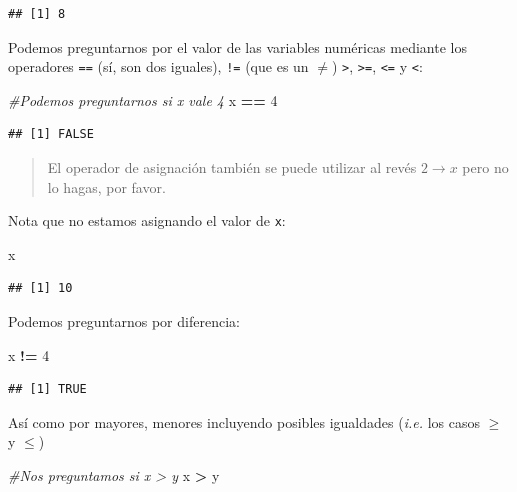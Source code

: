 \documentclass[
]{book}
\newenvironment{Shaded}{\begin{snugshade}}{\end{snugshade}}
\newcommand{\CommentTok}[1]{\textcolor[rgb]{0.56,0.35,0.01}{\textit{#1}}}
\newcommand{\DecValTok}[1]{\textcolor[rgb]{0.00,0.00,0.81}{#1}}
\newcommand{\NormalTok}[1]{#1}
\newcommand{\OperatorTok}[1]{\textcolor[rgb]{0.81,0.36,0.00}{\textbf{#1}}}
\newcommand{\StringTok}[1]{\textcolor[rgb]{0.31,0.60,0.02}{#1}}
\begin{document}
\begin{verbatim}
## [1] 8
\end{verbatim}

Podemos preguntarnos por el valor de las variables numéricas mediante los operadores \texttt{==} (sí, son dos iguales), \texttt{!=} (que es un \(\neq\)) \texttt{\textgreater{}}, \texttt{\textgreater{}=}, \texttt{\textless{}=} y \texttt{\textless{}}:

\begin{Shaded}
\begin{Highlighting}[]
\CommentTok{#Podemos preguntarnos si x vale 4}
\NormalTok{x }\OperatorTok{==}\StringTok{ }\DecValTok{4}
\end{Highlighting}
\end{Shaded}

\begin{verbatim}
## [1] FALSE
\end{verbatim}

\begin{quote}
El operador de asignación también se puede utilizar al revés \(2 \rightarrow x\) pero no lo hagas, por favor.
\end{quote}

Nota que no estamos asignando el valor de \texttt{x}:

\begin{Shaded}
\begin{Highlighting}[]
\NormalTok{x}
\end{Highlighting}
\end{Shaded}

\begin{verbatim}
## [1] 10
\end{verbatim}

Podemos preguntarnos por diferencia:

\begin{Shaded}
\begin{Highlighting}[]
\NormalTok{x }\OperatorTok{!=}\StringTok{ }\DecValTok{4} 
\end{Highlighting}
\end{Shaded}

\begin{verbatim}
## [1] TRUE
\end{verbatim}

Así como por mayores, menores incluyendo posibles igualdades (\emph{i.e.} los casos \(\geq\) y \(\leq\))

\begin{Shaded}
\begin{Highlighting}[]
\CommentTok{#Nos preguntamos si x > y}
\NormalTok{x }\OperatorTok{>}\StringTok{ }\NormalTok{y}
\end{Highlighting}
\end{Shaded}
\end{document}
